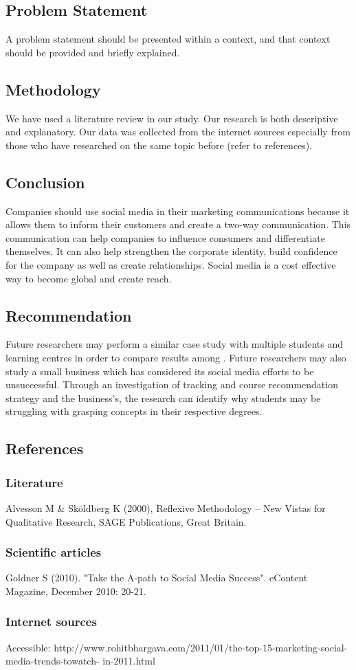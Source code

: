 \documentclass{article}
\begin{document}
\subsection{Problem Statement}
A problem statement should be presented within a context, and that context should be provided and briefly explained.

\subsection{Methodology}
We have used a literature review in our study. Our research is both descriptive and explanatory. Our data was collected from the internet sources especially from those who have researched on the same topic before (refer to references).


\subsection{Conclusion}
Companies should use social media in their marketing communications because it allows them to inform their customers and create a two-way communication. This communication can help companies to influence consumers and differentiate themselves. It can also help strengthen the corporate identity, build confidence for the company as well as create relationships. Social media is a cost effective way to become global and create reach.

\subsection{Recommendation}
Future researchers may perform a similar case study with multiple students and learning centres in order to compare results among . Future researchers may also study a small business which has considered its
social media efforts to be unsuccessful. Through an investigation of tracking and course recommendation strategy and the business’s, the research can identify why students may be struggling with grasping concepts in their respective degrees.

\subsection{References}

\subsubsection{Literature}
Alvesson M & Sköldberg K (2000), Reflexive Methodology – New Vistas for Qualitative Research, SAGE Publications, Great Britain.

\subsubsection{Scientific articles}
Goldner S (2010). "Take the A-path to Social Media Success". eContent Magazine, December 2010: 20-21.

\subsubsection{Internet sources}
Accessible: http://www.rohitbhargava.com/2011/01/the-top-15-marketing-social-media-trends-towatch- in-2011.html 
\end{document}
